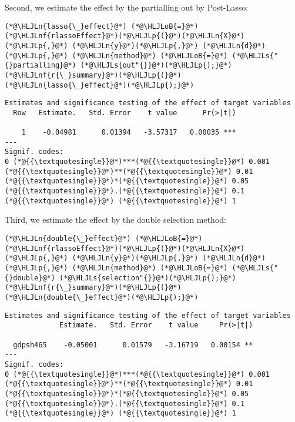 \documentclass[12pt,a4paper]{article}
\newcommand{\HLJLn}[1]{#1}
\newcommand{\HLJLnf}[1]{\textcolor[RGB]{66,102,213}{#1}}
\newcommand{\HLJLs}[1]{\textcolor[RGB]{201,61,57}{#1}}
\newcommand{\HLJLoB}[1]{\textcolor[RGB]{102,102,102}{\textbf{#1}}}
\newcommand{\HLJLp}[1]{#1}
\begin{document}
Second, we estimate the effect by the partialling out by Post-Lasso:


\begin{lstlisting}
(*@\HLJLn{lasso{\_}effect}@*) (*@\HLJLoB{=}@*) (*@\HLJLnf{rlassoEffect}@*)(*@\HLJLp{(}@*)(*@\HLJLn{X}@*)(*@\HLJLp{,}@*) (*@\HLJLn{y}@*)(*@\HLJLp{,}@*) (*@\HLJLn{d}@*)(*@\HLJLp{,}@*) (*@\HLJLn{method}@*) (*@\HLJLoB{=}@*) (*@\HLJLs{"{}partialling}@*) (*@\HLJLs{out"{}}@*)(*@\HLJLp{);}@*)
(*@\HLJLnf{r{\_}summary}@*)(*@\HLJLp{(}@*)(*@\HLJLn{lasso{\_}effect}@*)(*@\HLJLp{);}@*)
\end{lstlisting}

\begin{lstlisting}
Estimates and significance testing of the effect of target variables
  Row   Estimate.   Std. Error    t value      Pr(>|t|)

    1    -0.04981      0.01394   -3.57317   0.00035 ***
---
Signif. codes:
0 (*@{{\textquotesingle}}@*)***(*@{{\textquotesingle}}@*) 0.001 (*@{{\textquotesingle}}@*)**(*@{{\textquotesingle}}@*) 0.01 (*@{{\textquotesingle}}@*)*(*@{{\textquotesingle}}@*) 0.05 (*@{{\textquotesingle}}@*).(*@{{\textquotesingle}}@*) 0.1 (*@{{\textquotesingle}}@*) (*@{{\textquotesingle}}@*) 1
\end{lstlisting}


Third, we estimate the effect by the double selection method:


\begin{lstlisting}
(*@\HLJLn{double{\_}effect}@*) (*@\HLJLoB{=}@*) (*@\HLJLnf{rlassoEffect}@*)(*@\HLJLp{(}@*)(*@\HLJLn{X}@*)(*@\HLJLp{,}@*) (*@\HLJLn{y}@*)(*@\HLJLp{,}@*) (*@\HLJLn{d}@*)(*@\HLJLp{,}@*) (*@\HLJLn{method}@*) (*@\HLJLoB{=}@*) (*@\HLJLs{"{}double}@*) (*@\HLJLs{selection"{}}@*)(*@\HLJLp{);}@*)
(*@\HLJLnf{r{\_}summary}@*)(*@\HLJLp{(}@*)(*@\HLJLn{double{\_}effect}@*)(*@\HLJLp{);}@*)
\end{lstlisting}

\begin{lstlisting}
Estimates and significance testing of the effect of target variables
             Estimate.   Std. Error    t value     Pr(>|t|)

  gdpsh465    -0.05001      0.01579   -3.16719   0.00154 **
---
Signif. codes:
0 (*@{{\textquotesingle}}@*)***(*@{{\textquotesingle}}@*) 0.001 (*@{{\textquotesingle}}@*)**(*@{{\textquotesingle}}@*) 0.01 (*@{{\textquotesingle}}@*)*(*@{{\textquotesingle}}@*) 0.05 (*@{{\textquotesingle}}@*).(*@{{\textquotesingle}}@*) 0.1 (*@{{\textquotesingle}}@*) (*@{{\textquotesingle}}@*) 1
\end{lstlisting}
\end{document}
